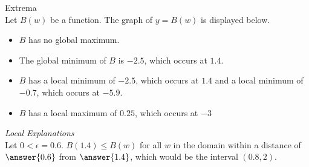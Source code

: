 \documentclass{ximera}
\begin{document}
\begin{example} Extrema \\

Let $B(w)$ be a function.  The graph of $y = B(w)$ is displayed below. 

\begin{image}
\end{image}

\begin{itemize}
\item $B$ has no global maximum.
\item The global minimum of $B$ is $-2.5$, which occurs at $1.4$.
\item $B$ has a local minimum of $-2.5$, which occurs at $1.4$ and a local minimum of $-0.7$, which occurs at $-5.9$.
\item $B$ has a local maximum of $0.25$, which occurs at $-3$
\end{itemize}

\end{example}


\textit{Local Explanations} \\

Let $0 < \epsilon = 0.6$.  $B(1.4) \leq B(w)$ for all $w$ in the domain within a distance of $\answer{0.6}$ from $\answer{1.4}$, which would be the interval $(0.8, 2)$.
\end{document}
